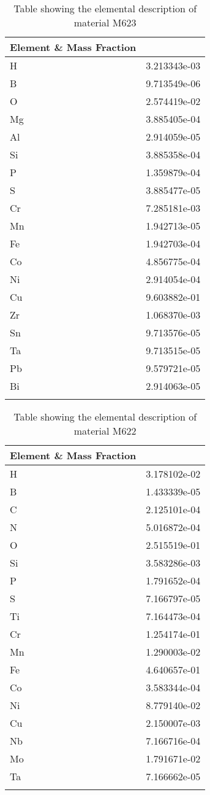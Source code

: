 \begin{centering}
\begin{longtable}[ht!]
{ p{} | p{} }
\hline
Element \& Mass Fraction\\
\hline
H &  3.213343e-03\\
B &  9.713549e-06\\
O &  2.574419e-02\\
Mg &  3.885405e-04\\
Al &  2.914059e-05\\
Si &  3.885358e-04\\
P &  1.359879e-04\\
S &  3.885477e-05\\
Cr &  7.285181e-03\\
Mn &  1.942713e-05\\
Fe &  1.942703e-04\\
Co &  4.856775e-04\\
Ni &  2.914054e-04\\
Cu &  9.603882e-01\\
Zr &  1.068370e-03\\
Sn &  9.713576e-05\\
Ta &  9.713515e-05\\
Pb &  9.579721e-05\\
Bi &  2.914063e-05\\
\caption{Table showing the elemental description of material M623}
\label{table:material_M623}
\end{longtable}
\clearpage

\begin{longtable}[ht!]
{ p{} | p{} }
\hline
Element \& Mass Fraction\\
\hline
H &  3.178102e-02\\
B &  1.433339e-05\\
C &  2.125101e-04\\
N &  5.016872e-04\\
O &  2.515519e-01\\
Si &  3.583286e-03\\
P &  1.791652e-04\\
S &  7.166797e-05\\
Ti &  7.164473e-04\\
Cr &  1.254174e-01\\
Mn &  1.290003e-02\\
Fe &  4.640657e-01\\
Co &  3.583344e-04\\
Ni &  8.779140e-02\\
Cu &  2.150007e-03\\
Nb &  7.166716e-04\\
Mo &  1.791671e-02\\
Ta &  7.166662e-05\\
\caption{Table showing the elemental description of material M622}
\label{table:material_M622}
\end{longtable}
\clearpage


\end{centering}
